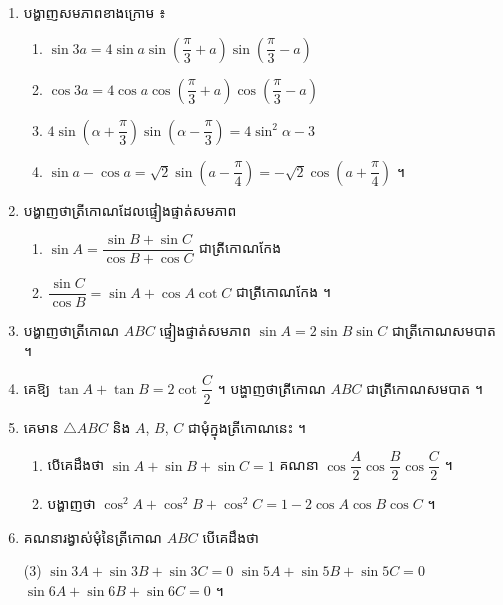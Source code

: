 \begin{enumerate}[1]
\begin{enumerate}[a]
    \item $\dfrac{\sin\alpha + \sin 3\alpha + \sin 5\alpha + \sin 7\alpha}{\cos\alpha + \cos 3\alpha + \cos 5\alpha + \cos 7\alpha}$ ។
  \end{enumerate}
  \item បង្ហាញសមភាពខាងក្រោម ៖
  \begin{enumerate}[a]
    \item $\sin 3a = 4\sin a\sin\left(\dfrac{\pi}{3} + a\right)\sin\left(\dfrac{\pi}{3} - a\right)$
    \item $\cos 3a = 4\cos a\cos\left(\dfrac{\pi}{3} + a\right)\cos\left(\dfrac{\pi}{3} - a\right)$
    \item $4\sin\left(\alpha + \dfrac{\pi}{3}\right)\sin\left(\alpha - \dfrac{\pi}{3}\right) = 4\sin^2\alpha - 3$
    \item $\sin a - \cos a = \sqrt{2}\sin\left(a - \dfrac{\pi}{4}\right) = -\sqrt{2}\cos\left(a + \dfrac{\pi}{4}\right)$ ។
  \end{enumerate}
  \item បង្ហាញថាត្រីកោណដែលផ្ទៀងផ្ទាត់សមភាព
  \begin{enumerate}[a]
    \item $\sin A = \dfrac{\sin B + \sin C}{\cos B + \cos C}$ ជាត្រីកោណកែង
    \item $\dfrac{\sin C}{\cos B} = \sin A + \cos A\cot C$ ជាត្រីកោណកែង ។
  \end{enumerate}
  \item បង្ហាញថាត្រីកោណ $ABC$ ផ្ទៀងផ្ទាត់សមភាព $\sin A = 2\sin B\sin C$ ជាត្រីកោណសមបាត ។
  \item គេឱ្យ $\tan A + \tan B = 2\cot\dfrac{C}{2}$ ។ បង្ហាញថាត្រីកោណ $ABC$ ជាត្រីកោណសមបាត ។
  \item គេមាន $\triangle ABC$ និង $A$, $B$, $C$ ជាមុំក្នុងត្រីកោណនេះ ។
  \begin{enumerate}[a]
    \item បើគេដឹងថា $\sin A + \sin B + \sin C = 1$ គណនា $\cos\dfrac{A}{2}\cos\dfrac{B}{2}\cos\dfrac{C}{2}$ ។
    \item បង្ហាញថា $\cos^2 A + \cos^2 B + \cos^2 C = 1 - 2\cos A\cos B\cos C$ ។
  \end{enumerate}
  \item គណនារង្វាស់មុំនៃត្រីកោណ $ABC$ បើគេដឹងថា
  \begin{tasks}(3)
    \task $\sin 3A + \sin 3B + \sin 3C = 0$
    \task $\sin 5A + \sin 5B + \sin 5C = 0$
    \task $\sin 6A + \sin 6B + \sin 6C = 0$ ។
  \end{tasks}
\end{enumerate}
